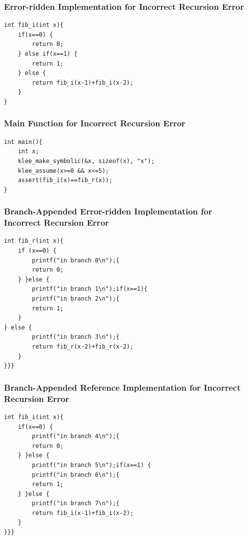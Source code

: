 \subsubsection{Error-ridden Implementation for Incorrect Recursion Error}
\begin{verbatim}
int fib_i(int x){
    if(x==0) {
        return 0;
    } else if(x==1) {
        return 1;
    } else {
        return fib_i(x-1)+fib_i(x-2);
    }
}
\end{verbatim}
\subsubsection{Main Function for Incorrect Recursion Error}
\begin{verbatim}
int main(){
    int x;
    klee_make_symbolic(&x, sizeof(x), "x");
    klee_assume(x>=0 && x<=5);
    assert(fib_i(x)==fib_r(x));
}
\end{verbatim}
\subsubsection{Branch-Appended Error-ridden Implementation for Incorrect Recursion Error}
\begin{verbatim}
int fib_r(int x){
    if (x==0) {
        printf("in branch 0\n");{
        return 0;
    } }else {
        printf("in branch 1\n");if(x==1){
        printf("in branch 2\n");{
        return 1;
    }
} else {
        printf("in branch 3\n");{
        return fib_r(x-2)+fib_r(x-2);
    }
}}}
\end{verbatim}

\subsubsection{Branch-Appended Reference Implementation for Incorrect Recursion Error}

\begin{verbatim}
int fib_i(int x){
    if(x==0) {
        printf("in branch 4\n");{
        return 0;
    } }else {
        printf("in branch 5\n");if(x==1) {
        printf("in branch 6\n");{
        return 1;
    } }else {
        printf("in branch 7\n");{
        return fib_i(x-1)+fib_i(x-2);
    }
}}}
\end{verbatim}

